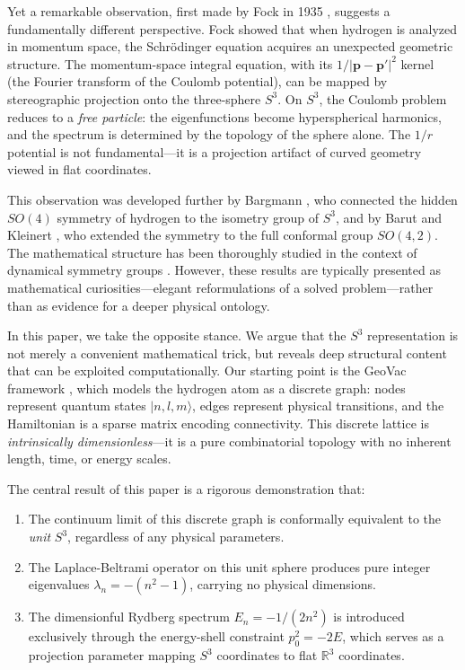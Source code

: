 \documentclass[aps,pra,twocolumn,superscriptaddress,longbibliography]{revtex4-2}
\begin{document}
Yet a remarkable observation, first made by Fock in 1935 \cite{fock1935}, suggests a fundamentally different perspective. Fock showed that when hydrogen is analyzed in momentum space, the Schr\"odinger equation acquires an unexpected geometric structure. The momentum-space integral equation, with its $1/|\mathbf{p} - \mathbf{p}'|^2$ kernel (the Fourier transform of the Coulomb potential), can be mapped by stereographic projection onto the three-sphere $S^3$. On $S^3$, the Coulomb problem reduces to a \textit{free particle}: the eigenfunctions become hyperspherical harmonics, and the spectrum is determined by the topology of the sphere alone. The $1/r$ potential is not fundamental---it is a projection artifact of curved geometry viewed in flat coordinates.

This observation was developed further by Bargmann \cite{bargmann1936}, who connected the hidden $SO(4)$ symmetry of hydrogen to the isometry group of $S^3$, and by Barut and Kleinert \cite{barut1967}, who extended the symmetry to the full conformal group $SO(4,2)$. The mathematical structure has been thoroughly studied in the context of dynamical symmetry groups \cite{bander1966,biedenharn1981}. However, these results are typically presented as mathematical curiosities---elegant reformulations of a solved problem---rather than as evidence for a deeper physical ontology.

In this paper, we take the opposite stance. We argue that the $S^3$ representation is not merely a convenient mathematical trick, but reveals deep structural content that can be exploited computationally. Our starting point is the GeoVac framework \cite{loutey_paper0,loutey_paper1}, which models the hydrogen atom as a discrete graph: nodes represent quantum states $|n, l, m\rangle$, edges represent physical transitions, and the Hamiltonian is a sparse matrix encoding connectivity. This discrete lattice is \textit{intrinsically dimensionless}---it is a pure combinatorial topology with no inherent length, time, or energy scales.

The central result of this paper is a rigorous demonstration that:
\begin{enumerate}
\item The continuum limit of this discrete graph is conformally equivalent to the \textit{unit} $S^3$, regardless of any physical parameters.
\item The Laplace-Beltrami operator on this unit sphere produces pure integer eigenvalues $\lambda_n = -(n^2 - 1)$, carrying no physical dimensions.
\item The dimensionful Rydberg spectrum $E_n = -1/(2n^2)$ is introduced exclusively through the energy-shell constraint $p_0^2 = -2E$, which serves as a projection parameter mapping $S^3$ coordinates to flat $\mathbb{R}^3$ coordinates.
\end{enumerate}
\end{document}
